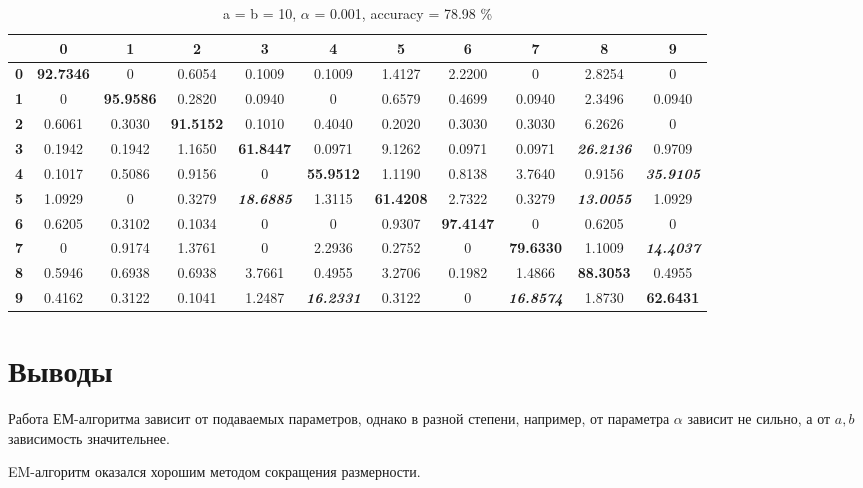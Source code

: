 \documentclass[twoside]{article}
\begin{document}
\begin{table}[h]
	\begin{center}
		\begin{tabular}{|c|c|c|c|c|c|c|c|c|c|c|}
			\hline
			& \textbf{0} & \textbf{1} & \textbf{2} & \textbf{3} & \textbf{4} & \textbf{5} & \textbf{6} & \textbf{7} & \textbf{8} & \textbf{9} \\ \hline
			\textbf{0} & \textbf{92.7346} & 0 & 0.6054 & 0.1009 & 0.1009 & 1.4127 & 2.2200 & 0 & 2.8254 & 0 \\ \hline
			\textbf{1} & 0 & \textbf{95.9586} & 0.2820 & 0.0940 & 0 & 0.6579 & 0.4699 & 0.0940 & 2.3496 & 0.0940 \\ \hline
			\textbf{2} & 0.6061 & 0.3030 & \textbf{91.5152} & 0.1010 & 0.4040 & 0.2020 & 0.3030 & 0.3030 & 6.2626 & 0 \\ \hline
			\textbf{3} & 0.1942 & 0.1942 & 1.1650 & \textbf{61.8447} & 0.0971 & 9.1262 & 0.0971 & 0.0971 & \textit{\textbf{26.2136}} & 0.9709 \\ \hline
			\textbf{4} & 0.1017 & 0.5086 & 0.9156 & 0 & \textbf{55.9512} & 1.1190 & 0.8138 & 3.7640 & 0.9156 & \textit{\textbf{35.9105}} \\ \hline
			\textbf{5} & 1.0929 & 0 & 0.3279 & \textit{\textbf{18.6885}} & 1.3115 & \textbf{61.4208} & 2.7322 & 0.3279 & \textit{\textbf{13.0055}} & 1.0929 \\ \hline
			\textbf{6} & 0.6205 & 0.3102 & 0.1034 & 0 & 0 & 0.9307 & \textbf{97.4147} & 0 & 0.6205 & 0 \\ \hline
			\textbf{7} & 0 & 0.9174 & 1.3761 & 0 & 2.2936 & 0.2752 & 0 & \textbf{79.6330} & 1.1009 & \textit{\textbf{14.4037}} \\ \hline
			\textbf{8} & 0.5946 & 0.6938 & 0.6938 & 3.7661 & 0.4955 & 3.2706 & 0.1982 & 1.4866 & \textbf{88.3053} & 0.4955 \\ \hline
			\textbf{9} & 0.4162 & 0.3122 & 0.1041 & 1.2487 & \textit{\textbf{16.2331}} & 0.3122 & 0 & \textit{\textbf{16.8574}} & 1.8730 & \textbf{62.6431} \\ \hline
		\end{tabular}
		\label{table:3}
		\caption{a = b = 10, $\alpha$ = 0.001, accuracy = 78.98 \%}
	\end{center}	
\end{table}
\section{Выводы}
Работа ЕМ-алгоритма зависит от подаваемых параметров, однако в разной степени, например, от параметра $\alpha$  зависит не сильно, а от $a, b$ зависимость значительнее.

EM-алгоритм оказался хорошим методом сокращения размерности.
\end{document}
